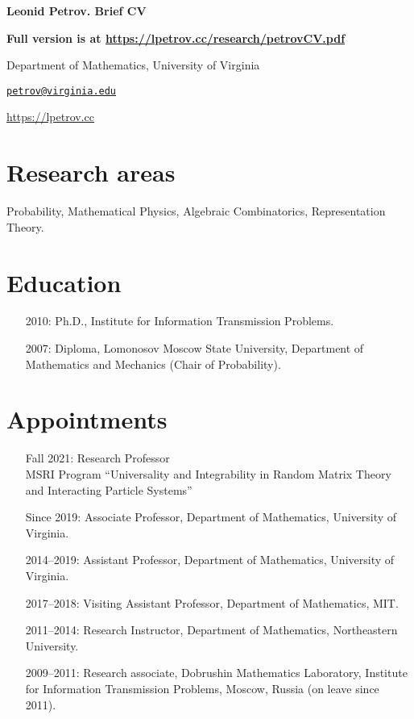 \documentclass[letterpaper,11pt]{article}
\def\name{Leonid Petrov}
\begin{document}
\centerline{\huge \bf \name . Brief CV}
\bigskip

\textbf{Full version is at \url{https://lpetrov.cc/research/petrovCV.pdf}}

\noindent\hrulefill

\vspace{0.25in}

Department of Mathematics, University of Virginia

\href{mailto:petrov@virginia.edu}{\tt petrov@virginia.edu}

\url{https://lpetrov.cc}

\section*{Research areas}

Probability, Mathematical Physics, Algebraic Combinatorics, Representation
Theory.

\section*{Education}

\begin{itemize}
	\item [2010:]
		Ph.D., 
		Institute for Information Transmission Problems.

	\item [2007:]
		Diploma,
		Lomonosov Moscow State University,
		Department of Mathematics and Mechanics (Chair of Probability).
\end{itemize}

\section*{Appointments}

\begin{itemize}
	\item [Fall 2021:]
		  Research Professor
		  \\
		  MSRI Program ``Universality and Integrability in Random Matrix Theory and Interacting Particle Systems''
	\item
	      [Since 2019:]
	      Associate Professor, Department of Mathematics, University
		  of Virginia.
	\item
	      [2014--2019:]
				Assistant Professor, Department of Mathematics, University
				of Virginia.
	\item
	      [2017--2018:]
				Visiting Assistant Professor, Department of Mathematics, MIT.
	\item
	      [2011--2014:]
				Research Instructor, Department of Mathematics, Northeastern
				University.
	\item
	      [2009--2011:]
				Research associate, Dobrushin Mathematics Laboratory,
	      Institute for Information Transmission Problems, Moscow, Russia (on leave
	      since 2011).
\end{itemize}
\end{document}
